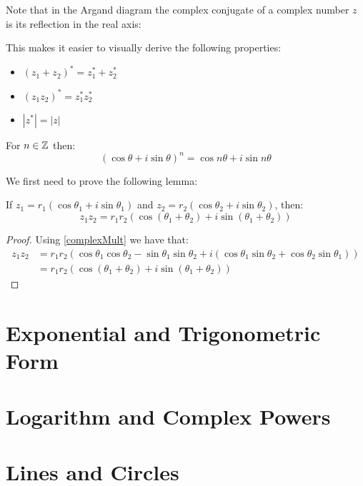 \documentclass[../main.tex]{subfiles}
\begin{document}
Note that in the Argand diagram the complex conjugate of a complex number $z$ is its reflection in the real axis:
\begin{center}
\end{center}

This makes it easier to visually derive the following properties:
\begin{itemize}
  \item $(z_1 + z_2)^{*} = z^{*}_{1} + z^{*}_{2}$
  \item $(z_1 z_2)^{*} = z^{*}_{1} z^{*}_{2}$
  \item $|z^{*}| = |z|$
\end{itemize}
\begin{theorem}
  For $n \in \mathbb{Z}$ then:
  \[
    (\cos \theta + i \sin \theta)^n = \cos n\theta + i \sin n\theta
  \] 
\end{theorem}
We first need to prove the following lemma:
\begin{lemma}
  If $z_1 = r_1(\cos \theta_1 + i \sin \theta_1)$ and $z_2 = r_2(\cos \theta_2 + i \sin \theta_2)$, then:
  \[
    z_1 z_2 = r_1 r_2 (\cos (\theta_1 + \theta_2) + i\sin(\theta_1 + \theta_2))
  \]
\end{lemma}
\begin{proof}
  Using \cref{complexMult} we have that:
  \begin{align*}
    z_1 z_2 &= r_1 r_2 (\cos \theta_1 \cos \theta_2 - \sin \theta_1 \sin \theta_2 + i(\cos \theta_1 \sin \theta_2 + \cos \theta_2 \sin \theta_1)) \\
            &= r_1 r_2 (\cos(\theta_1 + \theta_2) + i\sin(\theta_1 + \theta_2))
  \end{align*} 
\end{proof}
\section{Exponential and Trigonometric Form}
\section{Logarithm and Complex Powers}
\section{Lines and Circles}
\end{document}
